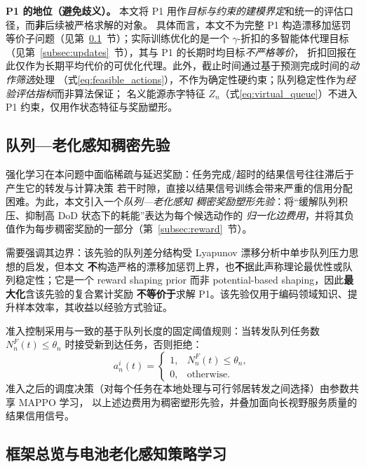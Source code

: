 \documentclass[a4paper,11pt]{article}
\begin{document}
\noindent\textbf{P1 的地位（避免歧义）。}
本文将 P1 用作\emph{目标与约束的建模界定}和统一的评估口径，而\textbf{非}后续被严格求解的对象。
具体而言，本文不为完整 P1 构造漂移加惩罚等价子问题（见第~\ref{subsec:prior}~节）；实际训练优化的是一个
$\gamma$-折扣的多智能体代理目标（见第~\ref{subsec:updates}~节），其与 P1 的长期时均目标\emph{不严格等价}，
折扣回报在此仅作为长期平均代价的可优化代理。此外，截止时间通过基于预测完成时间的\emph{动作筛选}处理
（式\eqref{eq:feasible_actions}），不作为确定性硬约束；队列稳定性作为\emph{经验评估指标}而非算法保证；
名义能源赤字特征 $Z_n$（式\eqref{eq:virtual_queue}）不进入 P1 约束，仅用作状态特征与奖励塑形。

\subsection{队列—老化感知稠密先验}
\label{subsec:prior}

强化学习在本问题中面临稀疏与延迟奖励：任务完成/超时的结果信号往往滞后于产生它的转发与计算决策
若干时隙，直接以结果信号训练会带来严重的信用分配困难。为此，本文引入一个\emph{队列—老化感知
稠密奖励塑形先验}：将``缓解队列积压、抑制高 DoD 状态下的耗能''表达为每个候选动作的
\emph{归一化边费用}，并将其负值作为每步稠密奖励的一部分（第~\ref{subsec:reward}~节）。

需要强调其边界：该先验的队列差分结构受 Lyapunov 漂移分析中单步队列压力思想的启发，但本文
\textbf{不}构造严格的漂移加惩罚上界，也\textbf{不}据此声称理论最优性或队列稳定性；它是一个
reward shaping prior 而非 potential-based shaping，因此\textbf{最大化}含该先验的复合累计奖励
\textbf{不等价于}求解 P1。该先验仅用于编码领域知识、提升样本效率，其收益以经验方式验证。

准入控制采用与\cite{zhang2024mhspo}一致的基于队列长度的固定阈值规则：当转发队列任务数
$N^F_n(t) \le \theta_n$ 时接受新到达任务，否则拒绝：
\begin{equation}
a^i_n(t) = \begin{cases} 1, & N^F_n(t) \leq \theta_n, \\ 0, & \text{otherwise.} \end{cases}
\label{eq:admission}
\end{equation}
准入之后的调度决策（对每个任务在本地处理与可行邻居转发之间选择）由参数共享 MAPPO 学习，
以上述边费用为稠密塑形先验，并叠加面向长视野服务质量的结果信用信号。

\subsection{框架总览与电池老化感知策略学习}
\label{subsec:mappo}
\end{document}
